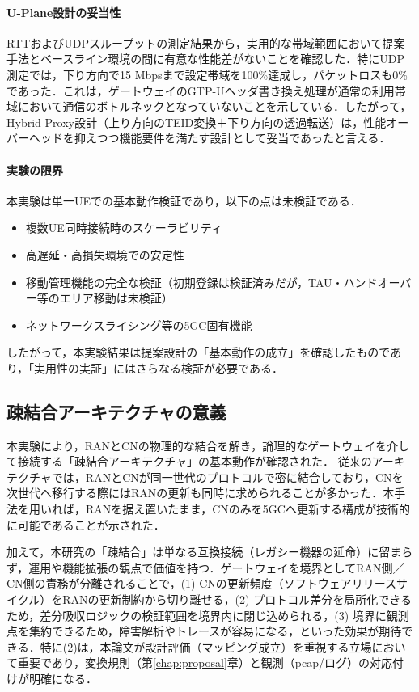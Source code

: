 \paragraph{U-Plane設計の妥当性}
RTTおよびUDPスループットの測定結果から，実用的な帯域範囲において提案手法とベースライン環境の間に有意な性能差がないことを確認した．特にUDP測定では，下り方向で15 Mbpsまで設定帯域を100\%達成し，パケットロスも0\%であった．これは，ゲートウェイのGTP-Uヘッダ書き換え処理が通常の利用帯域において通信のボトルネックとなっていないことを示している．したがって，Hybrid Proxy設計（上り方向のTEID変換＋下り方向の透過転送）は，性能オーバーヘッドを抑えつつ機能要件を満たす設計として妥当であったと言える．

\paragraph{実験の限界}
本実験は単一UEでの基本動作検証であり，以下の点は未検証である．
\begin{itemize}
    \item 複数UE同時接続時のスケーラビリティ
    \item 高遅延・高損失環境での安定性
    \item 移動管理機能の完全な検証（初期登録は検証済みだが，TAU・ハンドオーバー等のエリア移動は未検証）
    \item ネットワークスライシング等の5GC固有機能
\end{itemize}
したがって，本実験結果は提案設計の「基本動作の成立」を確認したものであり，「実用性の実証」にはさらなる検証が必要である．

\subsection{疎結合アーキテクチャの意義}
本実験により，RANとCNの物理的な結合を解き，論理的なゲートウェイを介して接続する「疎結合アーキテクチャ」の基本動作が確認された．
従来のアーキテクチャでは，RANとCNが同一世代のプロトコルで密に結合しており，CNを次世代へ移行する際にはRANの更新も同時に求められることが多かった．本手法を用いれば，RANを据え置いたまま，CNのみを5GCへ更新する構成が技術的に可能であることが示された．

加えて，本研究の「疎結合」は単なる互換接続（レガシー機器の延命）に留まらず，運用や機能拡張の観点で価値を持つ．ゲートウェイを境界としてRAN側／CN側の責務が分離されることで，(1) CNの更新頻度（ソフトウェアリリースサイクル）をRANの更新制約から切り離せる，(2) プロトコル差分を局所化できるため，差分吸収ロジックの検証範囲を境界内に閉じ込められる，(3) 境界に観測点を集約できるため，障害解析やトレースが容易になる，といった効果が期待できる．特に(2)は，本論文が設計評価（マッピング成立）を重視する立場において重要であり，変換規則（第\ref{chap:proposal}章）と観測（pcap/ログ）の対応付けが明確になる．

